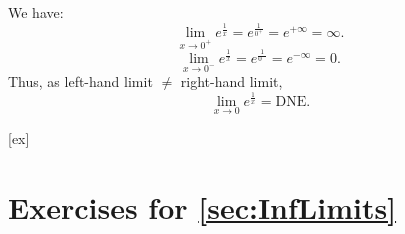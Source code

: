 \begin{solution} 
We have:
$$\lim_{x\to 0^+} e^{\frac{1}{x}}=e^{\frac{1}{0^+}}=e^{+\infty}=\infty.$$
$$\lim_{x\to 0^-} e^{\frac{1}{x}}=e^{\frac{1}{0^-}}=e^{-\infty}=0.$$
Thus, as left-hand limit $\neq$ right-hand limit, 
$$\lim_{x\to 0} e^{\frac{1}{x}}=\mbox{DNE}.$$
\end{solution}









[ex]
\section*{Exercises for \ref{sec:InfLimits}}

